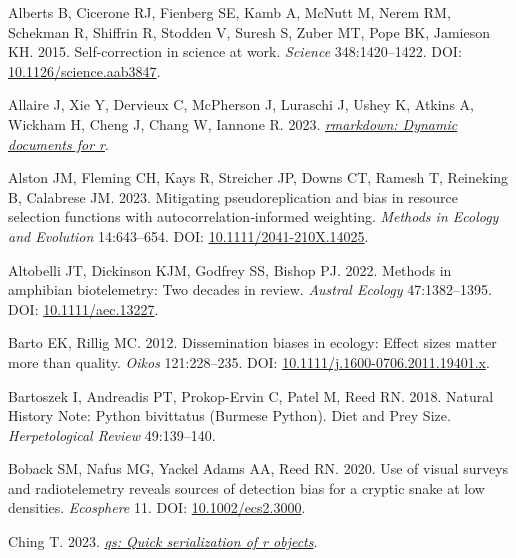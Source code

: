\documentclass[10pt,a4paper]{article}
\newlength{\cslhangindent}
\newenvironment{CSLReferences}[2] %
 {\begin{list}{}{%
  \setlength{\itemindent}{0pt}
  \setlength{\leftmargin}{0pt}
  \setlength{\parsep}{0pt}
  \ifodd #1
   \setlength{\leftmargin}{\cslhangindent}
   \setlength{\itemindent}{-1\cslhangindent}
  \fi
  \setlength{\itemsep}{#2\baselineskip}}}
 {\end{list}}
\begin{document}
\label{refs}
\begin{CSLReferences}{1}{0}
Alberts B, Cicerone RJ, Fienberg SE, Kamb A, McNutt M, Nerem RM, Schekman R, Shiffrin R, Stodden V, Suresh S, Zuber MT, Pope BK, Jamieson KH. 2015. Self-correction in science at work. \emph{Science} 348:1420--1422. DOI: \href{https://doi.org/10.1126/science.aab3847}{10.1126/science.aab3847}.

Allaire J, Xie Y, Dervieux C, McPherson J, Luraschi J, Ushey K, Atkins A, Wickham H, Cheng J, Chang W, Iannone R. 2023. \emph{\href{https://github.com/rstudio/rmarkdown}{{rmarkdown}: Dynamic documents for r}}.

Alston JM, Fleming CH, Kays R, Streicher JP, Downs CT, Ramesh T, Reineking B, Calabrese JM. 2023. Mitigating pseudoreplication and bias in resource selection functions with autocorrelation‐informed weighting. \emph{Methods in Ecology and Evolution} 14:643--654. DOI: \href{https://doi.org/10.1111/2041-210X.14025}{10.1111/2041-210X.14025}.

Altobelli JT, Dickinson KJM, Godfrey SS, Bishop PJ. 2022. Methods in amphibian biotelemetry: {Two} decades in review. \emph{Austral Ecology} 47:1382--1395. DOI: \href{https://doi.org/10.1111/aec.13227}{10.1111/aec.13227}.

Barto EK, Rillig MC. 2012. Dissemination biases in ecology: Effect sizes matter more than quality. \emph{Oikos} 121:228--235. DOI: \href{https://doi.org/10.1111/j.1600-0706.2011.19401.x}{10.1111/j.1600-0706.2011.19401.x}.

Bartoszek I, Andreadis PT, Prokop-Ervin C, Patel M, Reed RN. 2018. Natural {History} {Note}: {Python} bivittatus ({Burmese} {Python}). {Diet} and {Prey} {Size}. \emph{Herpetological Review} 49:139--140.

Boback SM, Nafus MG, Yackel Adams AA, Reed RN. 2020. Use of visual surveys and radiotelemetry reveals sources of detection bias for a cryptic snake at low densities. \emph{Ecosphere} 11. DOI: \href{https://doi.org/10.1002/ecs2.3000}{10.1002/ecs2.3000}.

Ching T. 2023. \emph{\href{https://CRAN.R-project.org/package=qs}{{qs}: Quick serialization of r objects}}.


\end{CSLReferences}
\end{document}
